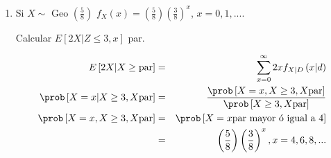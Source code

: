 \begin{enumerate}
 $X_{1} \equiv$  No. de lanzamientos para obtener la cara 1  (La cara que salga al tirar por primera vez un dado).
 $p_{1} = 1 \Rightarrow X_{1} \sim $Geo $\left( 1 \right) \Rightarrow E \left[X_{1} \right] = 1$
 
 \smallskip
 
 $X_{2} \equiv$  No. de lanzamientos necesarios para obtener la cara 2. (La cara 2 es la primera cara diferente a la cara 1, como la cara 1 ya sali\'o por primera vez, entonces s\'olo interesa que salga cualquiera de las 5 restantes).
 
 \smallskip
 
 $p_{2} = \frac{5}{6} \Rightarrow X_{2} \sim $ Geo $\left(\frac{5}{6} \right) \Rightarrow E \left[X_{2} \right] = \frac{1}{\frac{5}{6}}= \frac{6}{5}$
 
 \smallskip
 
 Razonamiento an\'alogico


\begin{eqnarray*}
p_{3} =  \frac{4}{6}= \frac{2}{3} & X_{3} \sim \textrm{Geo} \left(\frac{2}{3}\right) & E \left[ X_{3}\right] = \frac{3}{2} \\
p_{4}=  \frac{3}{6}= \frac{1}{2} & X_{4} \sim \textrm{Geo} \left(\frac{1}{2}\right) & E \left[ X_{4}\right] =2 \\
p_{5}=  \frac{2}{6}= \frac{1}{3} & X_{5} \sim \textrm{Geo} \left(\frac{1}{3}\right) & E \left[ X_{5}\right] = 3 \\
p_{6}=  \frac{1}{6} & X_{6} \sim \textrm{Geo} \left(\frac{1}{6}\right) & E \left[ X_{6}\right] = 6 
\end{eqnarray*}


\begin{eqnarray*}
\therefore E \left[X \right] &=& 1 + \frac{6}{5}+ \frac{3}{2}+2+3+6 = 12 + \frac{12+15}{10}\\
&=& \frac{120+12+15}{10}= \frac{147}{10} = 14.7
\end{eqnarray*}

\item

Si $X \sim$ Geo $\left(\frac{5}{8} \right)$ $f_{X} \left(x \right)= \left(\frac{5}{8} \right) \left(\frac{3}{8} \right)^x$, $x=0,1,....$ 

\smallskip

Calcular $E \left[2X | Z \leq 3, x \right]$ par.

\begin{eqnarray*}
E  \left[2X | X \geq \textrm{par} \right] &=& \sum_{x=0}^{\infty} 2x f_{X|D} \left(x|d \right)\\
\prob \left[X=x | X \geq 3 , X \textrm{par} \right]&=& \frac{\prob\left[X=x , X \geq 3, X \textrm{par} \right]}{\prob \left[X \geq 3 , X \textrm{par} \right]}\\
\prob \left[ X=x , X \geq 3 , X \textrm{par} \right] &=& \prob \left[X=x \textrm{par mayor \'o igual a 4} \right]\\
&=& \left(\frac{5}{8} \right)\left(\frac{3}{8} \right)^{x} , x=4,6,8,...
\end{eqnarray*}



\end{enumerate}

